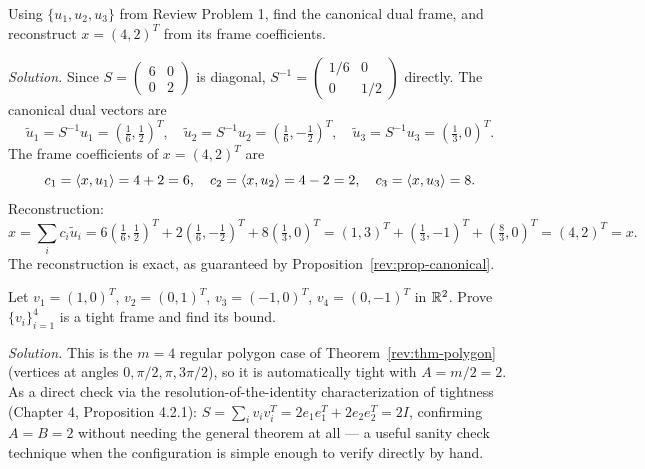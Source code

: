 \begin{examplebox}[title={Review Problem 2: Canonical dual and reconstruction}]
\label{rev:problem2}
Using $\{u_1,u_2,u_3\}$ from Review Problem 1, find the canonical dual
frame, and reconstruct $x=(4,2)^T$ from its frame coefficients.

\smallskip
\textit{Solution.} Since $S=\begin{pmatrix}6&0\\0&2\end{pmatrix}$ is
diagonal, $S^{-1}=\begin{pmatrix}1/6&0\\0&1/2\end{pmatrix}$ directly.
The canonical dual vectors are
\[
  \tilde u_1 = S^{-1}u_1 = (\tfrac16,\tfrac12)^T,\quad
  \tilde u_2 = S^{-1}u_2 = (\tfrac16,-\tfrac12)^T,\quad
  \tilde u_3 = S^{-1}u_3 = (\tfrac13,0)^T.
\]
The frame coefficients of $x=(4,2)^T$ are
\[
  c_1=\left\langle x, u_1 \right\rangle=4+2=6,\quad c_2=\left\langle x, u_2 \right\rangle=4-2=2,\quad
  c_3=\left\langle x, u_3 \right\rangle=8.
\]
Reconstruction:
\[
  \hat x = \sum_i c_i\tilde u_i
  = 6(\tfrac16,\tfrac12)^T + 2(\tfrac16,-\tfrac12)^T + 8(\tfrac13,0)^T
  = (1,3)^T+(\tfrac13,-1)^T+(\tfrac83,0)^T = (4,2)^T = x.
\]
The reconstruction is exact, as guaranteed by
Proposition~\ref{rev:prop-canonical}.
\end{examplebox}

\begin{examplebox}[title={Review Problem 3: A tightness proof}]
\label{rev:problem3}
Let $v_1=(1,0)^T$, $v_2=(0,1)^T$, $v_3=(-1,0)^T$, $v_4=(0,-1)^T$ in
$\mathbb{R}^2$. Prove $\{v_i\}_{i=1}^4$ is a tight frame and find its bound.

\smallskip
\textit{Solution.} This is the $m=4$ regular polygon case of
Theorem~\ref{rev:thm-polygon} (vertices at angles $0,\pi/2,\pi,3\pi/2$),
so it is automatically tight with $A=m/2=2$. As a direct check via the
resolution-of-the-identity characterization of tightness (Chapter 4,
Proposition 4.2.1): $S=\sum_iv_iv_i^T
= 2e_1e_1^T+2e_2e_2^T=2I$, confirming $A=B=2$ without needing the
general theorem at all --- a useful sanity check technique when the
configuration is simple enough to verify directly by hand.
\end{examplebox}


